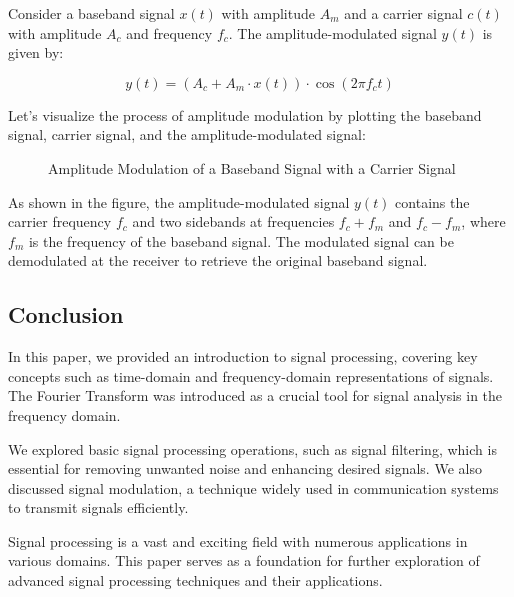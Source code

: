 \documentclass{article}
\begin{document}
Consider a baseband signal $x(t)$ with amplitude $A_m$ and a carrier signal $c(t)$ with amplitude $A_c$ and frequency $f_c$. The amplitude-modulated signal $y(t)$ is given by:

\begin{equation}
y(t) = (A_c + A_m \cdot x(t)) \cdot \cos(2\pi f_c t)
\end{equation}

Let's visualize the process of amplitude modulation by plotting the baseband signal, carrier signal, and the amplitude-modulated signal:

\begin{figure}[H]
    \centering
    \caption{Amplitude Modulation of a Baseband Signal with a Carrier Signal}
\end{figure}

As shown in the figure, the amplitude-modulated signal $y(t)$ contains the carrier frequency $f_c$ and two sidebands at frequencies $f_c + f_m$ and $f_c - f_m$, where $f_m$ is the frequency of the baseband signal. The modulated signal can be demodulated at the receiver to retrieve the original baseband signal.

\subsection{Conclusion}
In this paper, we provided an introduction to signal processing, covering key concepts such as time-domain and frequency-domain representations of signals. The Fourier Transform was introduced as a crucial tool for signal analysis in the frequency domain.

We explored basic signal processing operations, such as signal filtering, which is essential for removing unwanted noise and enhancing desired signals. We also discussed signal modulation, a technique widely used in communication systems to transmit signals efficiently.

Signal processing is a vast and exciting field with numerous applications in various domains. This paper serves as a foundation for further exploration of advanced signal processing techniques and their applications.
\end{document}
